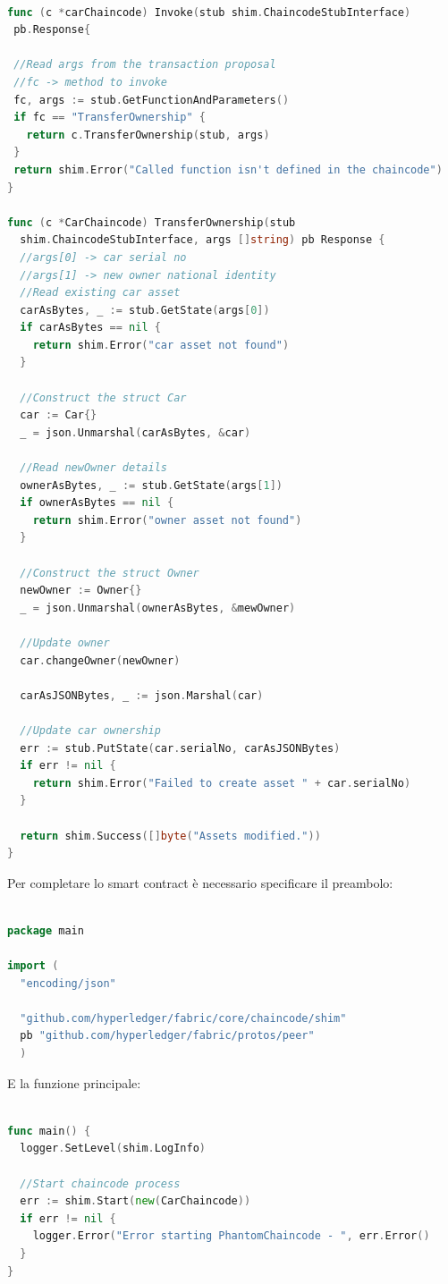 \begin{lstlisting}[language=Go]

func (c *carChaincode) Invoke(stub shim.ChaincodeStubInterface)
 pb.Response{
 
 //Read args from the transaction proposal
 //fc -> method to invoke
 fc, args := stub.GetFunctionAndParameters()
 if fc == "TransferOwnership" {
   return c.TransferOwnership(stub, args)
 }
 return shim.Error("Called function isn't defined in the chaincode")
}

func (c *CarChaincode) TransferOwnership(stub
  shim.ChaincodeStubInterface, args []string) pb Response {
  //args[0] -> car serial no
  //args[1] -> new owner national identity
  //Read existing car asset
  carAsBytes, _ := stub.GetState(args[0])
  if carAsBytes == nil {
    return shim.Error("car asset not found")
  }
  
  //Construct the struct Car
  car := Car{}
  _ = json.Unmarshal(carAsBytes, &car)
  
  //Read newOwner details
  ownerAsBytes, _ := stub.GetState(args[1])
  if ownerAsBytes == nil {
    return shim.Error("owner asset not found")
  }
  
  //Construct the struct Owner
  newOwner := Owner{}
  _ = json.Unmarshal(ownerAsBytes, &mewOwner)
  
  //Update owner
  car.changeOwner(newOwner)
  
  carAsJSONBytes, _ := json.Marshal(car)
  
  //Update car ownership
  err := stub.PutState(car.serialNo, carAsJSONBytes)
  if err != nil {
    return shim.Error("Failed to create asset " + car.serialNo)
  }
  
  return shim.Success([]byte("Assets modified."))
}

\end{lstlisting}

Per completare lo smart contract è necessario specificare il preambolo:

\begin{lstlisting}[language=Go]

package main

import (
  "encoding/json"
  
  "github.com/hyperledger/fabric/core/chaincode/shim"
  pb "github.com/hyperledger/fabric/protos/peer"
  )

\end{lstlisting}

E la funzione principale:
\begin{lstlisting}[language=Go]

func main() {
  logger.SetLevel(shim.LogInfo)
  
  //Start chaincode process
  err := shim.Start(new(CarChaincode))
  if err != nil {
    logger.Error("Error starting PhantomChaincode - ", err.Error()
  }
}

\end{lstlisting}
